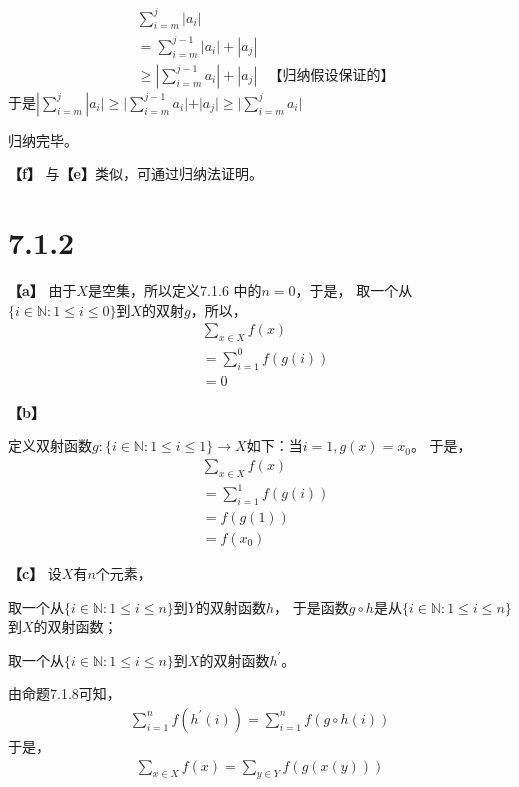 \documentclass{article}
\theoremstyle{mystyle}
\begin{document}
\begin{align*}
         & \sum \limits_{i=m}^j |a_i|                                       \\
         & = \sum \limits_{i=m}^{j-1} |a_i| + |a_j|                         \\
         & \geq |\sum \limits_{i=m}^{j-1} a_i| + |a_j| & \textbf{【归纳假设保证的】}
\end{align*}
于是$|\sum \limits_{i=m}^j |a_i| \geq |\sum \limits_{i=m}^{j-1} a_i| + |a_j| \geq |\sum \limits_{i=m}^j a_i|$

归纳完毕。

\textbf{【f】} 与\textbf{【e】}类似，可通过归纳法证明。

\section*{7.1.2}

\textbf{【a】}
由于$X$是空集，所以定义7.1.6 中的$n=0$，于是，
取一个从$\{i \in \mathbb{N}: 1 \leq i \leq 0\}$到$X$的双射$g$，所以，
\begin{align*}
         & \sum \limits_{x \in X}f(x)    \\
         & =\sum \limits_{i=1}^0 f(g(i)) \\
         & = 0
\end{align*}

\textbf{【b】}

定义双射函数$g:\{i \in \mathbb{N}: 1 \leq i \leq 1\} \rightarrow X$如下：当$i=1,g(x)=x_0$。
于是，
\begin{align*}
         & \sum \limits_{x \in X}f(x)    \\
         & =\sum \limits_{i=1}^1 f(g(i)) \\
         & = f(g(1))                     \\
         & = f(x_0)
\end{align*}

\textbf{【c】}
设$X$有$n$个元素，

取一个从$\{i \in \mathbb{N}: 1 \leq i \leq n\}$到$Y$的双射函数$h$，
于是函数$g \circ h$是从$\{i \in \mathbb{N}: 1 \leq i \leq n\}$到$X$的双射函数；

取一个从$\{i \in \mathbb{N}: 1 \leq i \leq n\}$到$X$的双射函数$h^\prime$。

由命题7.1.8可知，
\begin{align*}
        \sum \limits_{i=1}^n f(h^\prime(i)) = \sum \limits_{i=1}^n f(g \circ h(i))
\end{align*}
于是，
\begin{align*}
        \sum \limits_{x \in X}f(x) = \sum \limits_{y \in Y}f(g(x(y)))
\end{align*}
\end{document}

